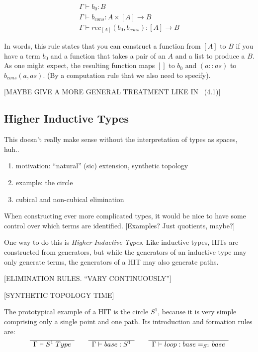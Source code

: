 \[
  \begin{array}{c}
    \Gamma \vdash b_0:B\\
    \Gamma \vdash b_{cons}: A \times [A] \rightarrow B\\
    \hline
    \Gamma \vdash rec_{[A]} (b_0, b_{cons}) : [A] \rightarrow B
  \end{array}
\]

In words, this rule states that you can construct a function from $[A]$ to $B$
if you have a term $b_0$ and a function that takes a pair of an $A$ and a list
to produce a $B$. As one might expect, the resulting function maps $[]$ to $b_0$
and $(a::as)$ to $b_{cons}(a,as)$. (By a computation rule that we also need to
specify).

[MAYBE GIVE A MORE GENERAL TREATMENT LIKE IN~\cite{Rijke2019} (4.1)]

\subsection{Higher Inductive Types}
This doesn't really make sense without the interpretation of types as spaces, huh..
\begin{enumerate}
\item motivation: ``natural'' (sic) extension, synthetic topology
\item example: the circle
\item cubical and non-cubical elimination
\end{enumerate}

When constructing ever more complicated types, it would be nice to have some
control over which terms are identified. [Examples? Just quotients, maybe?]

One way to do this is \emph{Higher Inductive Types}. Like inductive types, HITs
are constructed from generators, but while the generators of an inductive type
may only generate terms, the generators of a HIT may also generate paths.

[ELIMINATION RULES. ``VARY CONTINUOUSLY'']

[SYNTHETIC TOPOLOGY TIME]

The prototypical example of a HIT is the circle $S^1$, because it is very simple
comprising only a single point and one path. Its introduction and formation
rules are:
\begin{equation}
  \label{eq:circle}
  \begin{array}[t]{c}
    \hline
    \Gamma \vdash S^1 \; Type\\
  \end{array}
  \qquad
  \begin{array}[t]{c}
    \hline
    \Gamma \vdash base : S^1\\
  \end{array}
  \qquad
  \begin{array}[t]{c}
    \hline
    \Gamma \vdash loop : base =_{S^1} base
  \end{array}
\end{equation}